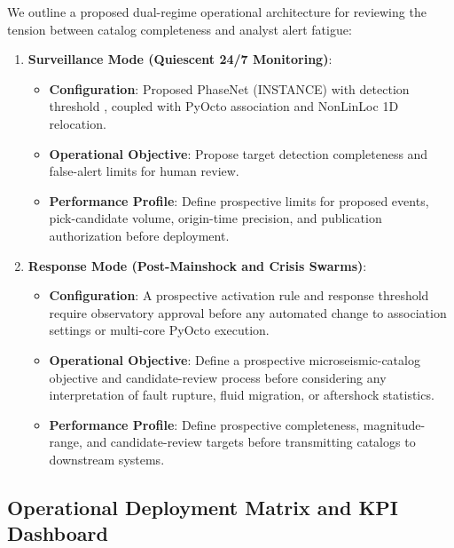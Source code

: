 We outline a proposed dual-regime operational architecture for
reviewing the tension between catalog completeness and analyst alert
fatigue:

\begin{enumerate}
  \item \textbf{Surveillance Mode (Quiescent 24/7 Monitoring)}:
    \begin{itemize}
      \item \textbf{Configuration}: Proposed \ac{PhaseNet}
        (\ac{INSTANCE}) with detection threshold
        , coupled with
        \ac{PyOcto} association and
        \ac{NonLinLoc} 1D relocation.
      \item \textbf{Operational Objective}: Propose target detection
        completeness and false-alert limits for human review.
      \item \textbf{Performance Profile}: Define prospective limits for
        proposed events, pick-candidate volume, origin-time precision, and
        publication authorization before deployment.
    \end{itemize}

  \item \textbf{Response Mode (Post-Mainshock and Crisis Swarms)}:
    \begin{itemize}
      \item \textbf{Configuration}: A prospective activation rule
         and response threshold
         require observatory approval
        before any automated change to association settings or
        multi-core \ac{PyOcto} execution.
      \item \textbf{Operational Objective}: Define a prospective
        microseismic-catalog objective and candidate-review process
        before considering any interpretation of fault rupture,
        fluid migration, or aftershock statistics.
      \item \textbf{Performance Profile}: Define prospective completeness,
        magnitude-range, and candidate-review targets before transmitting
        catalogs to downstream systems.
    \end{itemize}
\end{enumerate}

\subsection{Operational Deployment Matrix and KPI Dashboard}
\label{subsec:kpi_dashboard}

